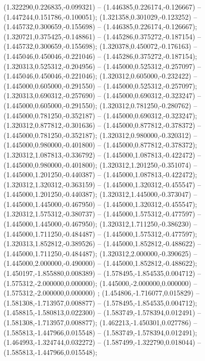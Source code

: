  (1.322290,0.226835,-0.099321) -- (1.446385,0.226174,-0.126667) -- (1.447244,0.151786,-0.100051);
 (1.321358,0.301029,-0.123252) -- (1.445732,0.300659,-0.155698) -- (1.446385,0.226174,-0.126667);
 (1.320721,0.375425,-0.148861) -- (1.445286,0.375272,-0.187154) -- (1.445732,0.300659,-0.155698);
 (1.320378,0.450072,-0.176163) -- (1.445046,0.450046,-0.221046) -- (1.445286,0.375272,-0.187154);
 (1.320313,0.525312,-0.204956) -- (1.445000,0.525312,-0.257097) -- (1.445046,0.450046,-0.221046);
 (1.320312,0.605000,-0.232422) -- (1.445000,0.605000,-0.291550) -- (1.445000,0.525312,-0.257097);
 (1.320313,0.690312,-0.257690) -- (1.445000,0.690312,-0.323247) -- (1.445000,0.605000,-0.291550);
 (1.320312,0.781250,-0.280762) -- (1.445000,0.781250,-0.352187) -- (1.445000,0.690312,-0.323247);
 (1.320312,0.877812,-0.301636) -- (1.445000,0.877812,-0.378372) -- (1.445000,0.781250,-0.352187);
 (1.320312,0.980000,-0.320312) -- (1.445000,0.980000,-0.401800) -- (1.445000,0.877812,-0.378372);
 (1.320312,1.087813,-0.336792) -- (1.445000,1.087813,-0.422472) -- (1.445000,0.980000,-0.401800);
 (1.320312,1.201250,-0.351074) -- (1.445000,1.201250,-0.440387) -- (1.445000,1.087813,-0.422472);
 (1.320312,1.320312,-0.363159) -- (1.445000,1.320312,-0.455547) -- (1.445000,1.201250,-0.440387);
 (1.320312,1.445000,-0.373047) -- (1.445000,1.445000,-0.467950) -- (1.445000,1.320312,-0.455547);
 (1.320312,1.575312,-0.380737) -- (1.445000,1.575312,-0.477597) -- (1.445000,1.445000,-0.467950);
 (1.320312,1.711250,-0.386230) -- (1.445000,1.711250,-0.484487) -- (1.445000,1.575312,-0.477597);
 (1.320313,1.852812,-0.389526) -- (1.445000,1.852812,-0.488622) -- (1.445000,1.711250,-0.484487);
 (1.320312,2.000000,-0.390625) -- (1.445000,2.000000,-0.490000) -- (1.445000,1.852812,-0.488622);
 (1.450197,-1.855880,0.008389) -- (1.578495,-1.854535,0.004712) -- (1.575312,-2.000000,0.000000);
 (1.445000,-2.000000,0.000000) -- (1.575312,-2.000000,0.000000) ;
 (1.454806,-1.716077,0.015829) -- (1.581308,-1.713957,0.008877) -- (1.578495,-1.854535,0.004712);
 (1.458815,-1.580813,0.022300) -- (1.583749,-1.578394,0.012491) -- (1.581308,-1.713957,0.008877);
 (1.462213,-1.450301,0.027786) -- (1.585813,-1.447966,0.015548) -- (1.583749,-1.578394,0.012491);
 (1.464993,-1.324744,0.032272) -- (1.587499,-1.322790,0.018044) -- (1.585813,-1.447966,0.015548);
